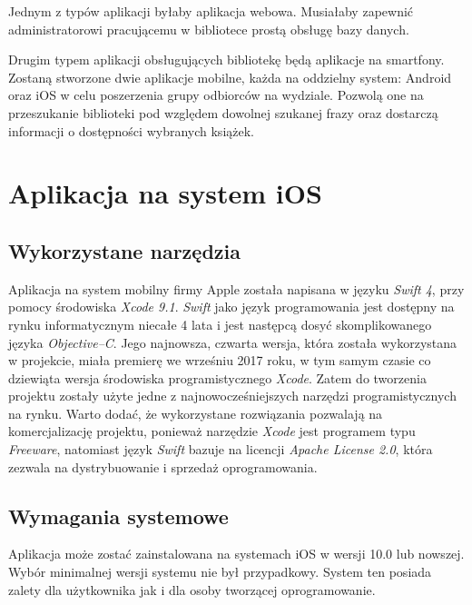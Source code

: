 \documentclass[twoside]{projektInzynierskiMS}
\begin{document}
Jednym z typów aplikacji byłaby aplikacja webowa. Musiałaby zapewnić administratorowi pracującemu w bibliotece prostą obsługę bazy danych.

Drugim typem aplikacji obsługujących bibliotekę będą aplikacje na smartfony. Zostaną stworzone dwie aplikacje mobilne, każda na oddzielny system: Android oraz iOS w celu poszerzenia grupy odbiorców na wydziale. Pozwolą one na przeszukanie biblioteki pod względem dowolnej szukanej frazy oraz dostarczą informacji o dostępności wybranych książek.


\section{Aplikacja na system iOS}

\subsection{Wykorzystane narzędzia}

Aplikacja na system mobilny firmy Apple została napisana w języku \textit{Swift 4}, przy pomocy środowiska \textit{Xcode 9.1}. \textit{Swift} jako język programowania jest dostępny na rynku informatycznym niecałe 4 lata i jest następcą dosyć skomplikowanego języka \textit{Objective--C}. Jego najnowsza, czwarta wersja, która została wykorzystana w projekcie, miała premierę we wrześniu 2017 roku, w tym samym czasie co dziewiąta wersja środowiska programistycznego \textit{Xcode}. Zatem do tworzenia projektu zostały użyte jedne z najnowocześniejszych narzędzi programistycznych na rynku. Warto dodać, że wykorzystane rozwiązania pozwalają na komercjalizację projektu, ponieważ narzędzie \textit{Xcode} jest programem typu \textit{Freeware}, natomiast język \textit{Swift} bazuje na licencji \textit{Apache License 2.0}, która zezwala na dystrybuowanie i sprzedaż oprogramowania.

\subsection{Wymagania systemowe}

Aplikacja może zostać zainstalowana na systemach iOS w wersji 10.0 lub nowszej. Wybór minimalnej wersji systemu nie był przypadkowy. System ten posiada zalety dla użytkownika jak i dla osoby tworzącej oprogramowanie.
\end{document}
